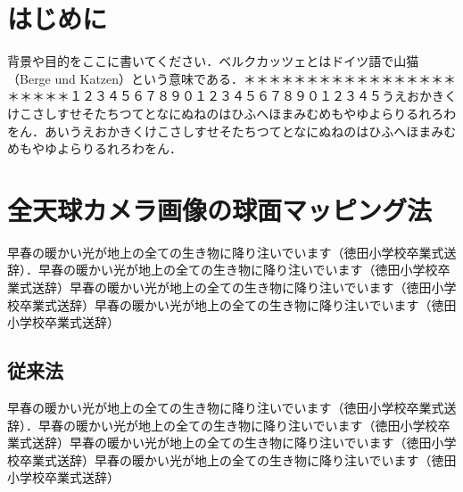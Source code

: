 \maketitle
\begin{multicols*}{2} %




\section{はじめに}
背景や目的をここに書いてください．ベルクカッツェとはドイツ語で山猫（Berge und Katzen）という意味である．＊＊＊＊＊＊＊＊＊＊＊＊＊＊＊＊＊＊＊＊＊＊１２３４５６７８９０１２３４５６７８９０１２３４５うえおかきくけこさしすせそたちつてとなにぬねのはひふへほまみむめもやゆよらりるれろわをん．あいうえおかきくけこさしすせそたちつてとなにぬねのはひふへほまみむめもやゆよらりるれろわをん．

\section{全天球カメラ画像の球面マッピング法}
早春の暖かい光が地上の全ての生き物に降り注いでいます（徳田小学校卒業式送辞）．早春の暖かい光が地上の全ての生き物に降り注いでいます（徳田小学校卒業式送辞）早春の暖かい光が地上の全ての生き物に降り注いでいます（徳田小学校卒業式送辞）早春の暖かい光が地上の全ての生き物に降り注いでいます（徳田小学校卒業式送辞）
\subsection{従来法}
早春の暖かい光が地上の全ての生き物に降り注いでいます（徳田小学校卒業式送辞）．早春の暖かい光が地上の全ての生き物に降り注いでいます（徳田小学校卒業式送辞）早春の暖かい光が地上の全ての生き物に降り注いでいます（徳田小学校卒業式送辞）早春の暖かい光が地上の全ての生き物に降り注いでいます（徳田小学校卒業式送辞）

\end{multicols*}
